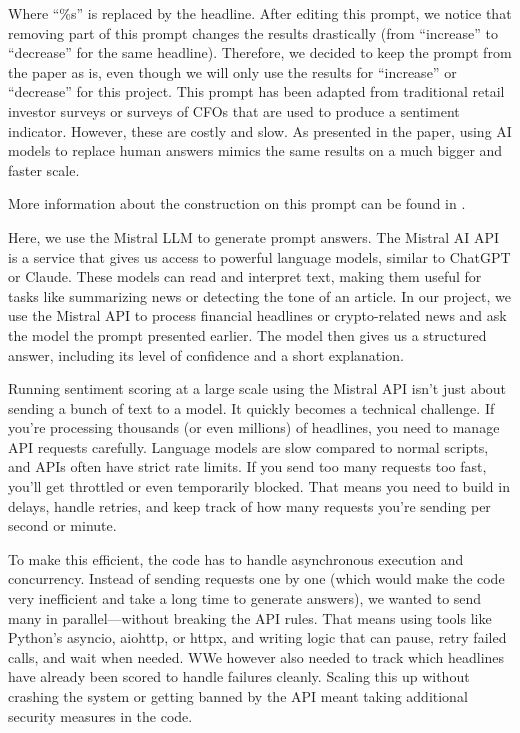 \documentclass[
  a4paper]{article}
\begin{document}
Where ``\%s'' is replaced by the headline. After editing this prompt, we
notice that removing part of this prompt changes the results drastically
(from ``increase'' to ``decrease'' for the same headline). Therefore, we
decided to keep the prompt from the paper as is, even though we will
only use the results for ``increase'' or ``decrease'' for this project.
This prompt has been adapted from traditional retail investor surveys or
surveys of CFOs that are used to produce a sentiment indicator. However,
these are costly and slow. As presented in the paper, using AI models to
replace human answers mimics the same results on a much bigger and
faster scale.

More information about the construction on this prompt can be found in
\textcite{leland_bybee_2025} .

Here, we use the Mistral LLM to generate prompt answers. The Mistral AI
API is a service that gives us access to powerful language models,
similar to ChatGPT or Claude. These models can read and interpret text,
making them useful for tasks like summarizing news or detecting the tone
of an article. In our project, we use the Mistral API to process
financial headlines or crypto-related news and ask the model the prompt
presented earlier. The model then gives us a structured answer,
including its level of confidence and a short explanation.

Running sentiment scoring at a large scale using the Mistral API isn't
just about sending a bunch of text to a model. It quickly becomes a
technical challenge. If you're processing thousands (or even millions)
of headlines, you need to manage API requests carefully. Language models
are slow compared to normal scripts, and APIs often have strict rate
limits. If you send too many requests too fast, you'll get throttled or
even temporarily blocked. That means you need to build in delays, handle
retries, and keep track of how many requests you're sending per second
or minute.

To make this efficient, the code has to handle asynchronous execution
and concurrency. Instead of sending requests one by one (which would
make the code very inefficient and take a long time to generate
answers), we wanted to send many in parallel---without breaking the API
rules. That means using tools like Python's asyncio, aiohttp, or httpx,
and writing logic that can pause, retry failed calls, and wait when
needed. WWe however also needed to track which headlines have already
been scored to handle failures cleanly. Scaling this up without crashing
the system or getting banned by the API meant taking additional security
measures in the code.
\end{document}
